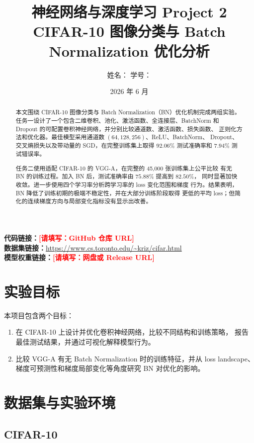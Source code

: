 \documentclass[UTF8,11pt,a4paper]{ctexart}
\title{\textbf{神经网络与深度学习 Project 2}\\
       CIFAR-10 图像分类与 Batch Normalization 优化分析}
\author{
  姓名：\todo{姓名}\qquad
  学号：\todo{学号}
}
\date{2026 年 6 月}
\newcommand{\todo}[1]{\textcolor{red}{\textbf{[请填写：#1]}}}
\begin{document}
\maketitle

\begin{abstract}
本文围绕 CIFAR-10 图像分类与 Batch Normalization（BN）优化机制完成两组实验。
任务一设计了一个包含二维卷积、池化、激活函数、全连接层、BatchNorm 和
Dropout 的可配置卷积神经网络，并分别比较通道数、激活函数、损失函数、
正则化方法和优化器。最佳模型采用通道数 $(64,128,256)$、ReLU、BatchNorm、
Dropout、交叉熵损失以及带动量的 SGD，在完整训练集上取得
$92.06\%$ 测试准确率和 $7.94\%$ 测试错误率。

任务二使用适配 CIFAR-10 的 VGG-A，在完整的 45,000 张训练集上公平比较
有无 BN 的训练过程。加入 BN 后，测试准确率由 $75.88\%$ 提高到 $82.50\%$，
同时显著加快收敛。进一步使用四个学习率分析跨学习率的 loss 变化范围和梯度
行为。结果表明，BN 降低了训练初期的极端不稳定性，并在大部分训练阶段取得
更低的平均 loss；但简化的连续梯度方向与局部变化指标没有显示出改善。
\end{abstract}

\noindent\textbf{代码链接：}\todo{GitHub 仓库 URL}\\
\textbf{数据集链接：}\url{https://www.cs.toronto.edu/~kriz/cifar.html}\\
\textbf{模型权重链接：}\todo{网盘或 Release URL}

\tableofcontents
\newpage

\section{实验目标}

本项目包含两个目标：
\begin{enumerate}
  \item 在 CIFAR-10 上设计并优化卷积神经网络，比较不同结构和训练策略，
        报告最佳测试结果，并通过可视化解释模型行为。
  \item 比较 VGG-A 有无 Batch Normalization 时的训练特征，并从 loss
        landscape、梯度可预测性和梯度局部变化等角度研究 BN 对优化的影响。
\end{enumerate}

\section{数据集与实验环境}

\subsection{CIFAR-10}
\end{document}

